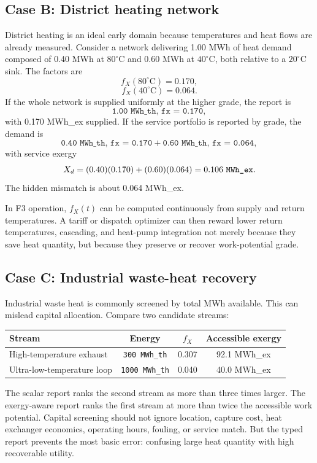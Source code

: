 \documentclass[11pt]{article}
\newcommand{\fx}{f_X}
\newcommand{\degC}{^{\circ}\mathrm{C}}
\begin{document}
\subsection*{Case B: District heating network}

District heating is an ideal early domain because temperatures and heat flows are already measured. Consider a network delivering 1.00 MWh of heat demand composed of 0.40 MWh at $80\degC$ and 0.60 MWh at $40\degC$, both relative to a $20\degC$ sink. The factors are
\begin{equation}
\fx(80\degC)=0.170,
\end{equation}
\begin{equation}
\fx(40\degC)=0.064.
\end{equation}
If the whole network is supplied uniformly at the higher grade, the report is
\begin{equation}
\texttt{1.00 MWh\_th, fx = 0.170},
\end{equation}
with 0.170 MWh\_ex supplied. If the service portfolio is reported by grade, the demand is
\begin{equation}
\texttt{0.40 MWh\_th, fx = 0.170}+\texttt{0.60 MWh\_th, fx = 0.064},
\end{equation}
with service exergy
\begin{equation}
X_d=(0.40)(0.170)+(0.60)(0.064)=0.106\ \text{\texttt{MWh\_ex}}.
\end{equation}
The hidden mismatch is about 0.064 MWh\_ex.

In F3 operation, $\fx(t)$ can be computed continuously from supply and return temperatures. A tariff or dispatch optimizer can then reward lower return temperatures, cascading, and heat-pump integration not merely because they save heat quantity, but because they preserve or recover work-potential grade.


\subsection*{Case C: Industrial waste-heat recovery}

Industrial waste heat is commonly screened by total MWh available. This can mislead capital allocation. Compare two candidate streams:
\begin{center}
\begin{tabular}{@{}lccc@{}}
\toprule
Stream & Energy & $\fx$ & Accessible exergy \\
\midrule
High-temperature exhaust & \texttt{300 MWh\_th} & 0.307 & 92.1 MWh\_ex \\
Ultra-low-temperature loop & \texttt{1000 MWh\_th} & 0.040 & 40.0 MWh\_ex \\
\bottomrule
\end{tabular}
\end{center}
The scalar report ranks the second stream as more than three times larger. The exergy-aware report ranks the first stream at more than twice the accessible work potential. Capital screening should not ignore location, capture cost, heat exchanger economics, operating hours, fouling, or service match. But the typed report prevents the most basic error: confusing large heat quantity with high recoverable utility.
\end{document}

